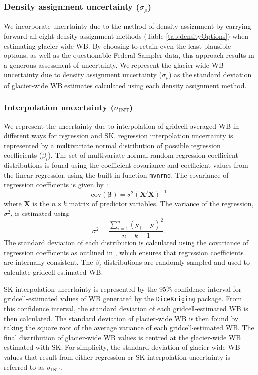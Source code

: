 \documentclass{sfuthesis}
\begin{document}
	\subsubsection{Density assignment uncertainty ($\sigma_{\rho}$)}
We incorporate uncertainty due to the method of density assignment by carrying forward all eight density assignment methods (Table \ref{tab:densityOptions}) when estimating glacier-wide WB. By choosing to retain even the least plausible options, as well as the questionable Federal Sampler data, this approach results in a generous assessment of uncertainty. We represent the glacier-wide WB uncertainty due to density assignment uncertainty ($\sigma_{\rho}$) as the standard deviation of glacier-wide WB estimates calculated using each density assignment method.

	\subsubsection{Interpolation uncertainty ($\sigma_{\mathrm{INT}}$)}
We represent the uncertainty due to interpolation of gridcell-averaged WB in different ways for regression and SK. regression interpolation uncertainty is represented by a multivariate normal distribution of possible regression coefficients ($\beta_i$). The set of multivariate normal random regression coefficient distributions is found using the coefficient covariance and coefficient values from the linear regression using the built-in function \texttt{mvnrnd}. The covariance of regression coefficients is given by \citep{Bagos2015}:
\begin{equation}
\mathrm{cov}\left( \boldsymbol{\beta} \right) = \sigma^2 \left( \boldsymbol{X}'  \boldsymbol{X} \right)^{-1}
\end{equation}
where $\boldsymbol{X}$ is the $n \times k$ matrix of predictor variables. The variance of the regression, $\sigma^2$, is estimated using
\begin{equation}
\sigma^2 = \frac{\sum^n_{i=1} \left(\boldsymbol{y}_i-\bar{\boldsymbol{y}} \right)^2}{n-k-1}.
\end{equation}
The standard deviation of each distribution is calculated using the covariance of regression coefficients as outlined in \cite{Bagos2015}, which ensures that regression coefficients are internally consistent. The $\beta_i$ distributions are randomly sampled and used to calculate gridcell-estimated WB.	

SK interpolation uncertainty is represented by the 95\% confidence interval for gridcell-estimated values of WB generated by the \texttt{DiceKriging} package. From this confidence interval, the standard deviation of each gridcell-estimated WB is then calculated. The standard deviation of glacier-wide WB is then found by taking the square root of the average variance of each gridcell-estimated WB. The final distribution of glacier-wide WB values is centred at the glacier-wide WB estimated with SK. For simplicity, the standard deviation of glacier-wide WB values that result from either regression or SK interpolation uncertainty is referred to as $\sigma_{\mathrm{INT}}$.
\end{document}
